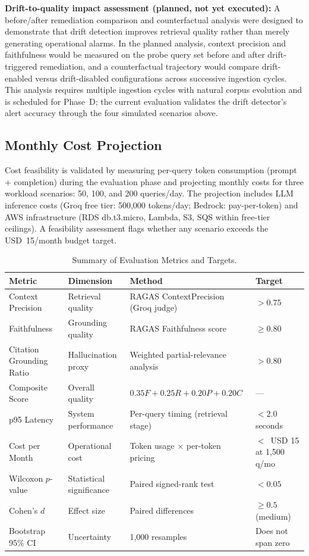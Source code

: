 \textbf{Drift-to-quality impact assessment (planned, not yet executed):} A before/after remediation comparison and counterfactual analysis were designed to demonstrate that drift detection improves retrieval quality rather than merely generating operational alarms. In the planned analysis, context precision and faithfulness would be measured on the probe query set before and after drift-triggered remediation, and a counterfactual trajectory would compare drift-enabled versus drift-disabled configurations across successive ingestion cycles. This analysis requires multiple ingestion cycles with natural corpus evolution and is scheduled for Phase~D; the current evaluation validates the drift detector's alert accuracy through the four simulated scenarios above.

\subsection{Monthly Cost Projection}
\label{sec:cost_projection}

Cost feasibility is validated by measuring per-query token consumption (prompt + completion) during the evaluation phase and projecting monthly costs for three workload scenarios: 50, 100, and 200 queries/day. The projection includes LLM inference costs (Groq free tier: 500{,}000 tokens/day; Bedrock: pay-per-token) and AWS infrastructure (RDS db.t3.micro, Lambda, S3, SQS within free-tier ceilings). A feasibility assessment flags whether any scenario exceeds the USD~15/month budget target.

\begin{table}[H]
\caption{Summary of Evaluation Metrics and Targets.}
\label{tab:eval_targets}
\centering
\begin{tabular}{p{3.0cm}p{3.0cm}p{3.2cm}p{3.0cm}}
\toprule
\textbf{Metric} & \textbf{Dimension} & \textbf{Method} & \textbf{Target} \\
\midrule
Context Precision & Retrieval quality & RAGAS ContextPrecision (Groq judge) & $> 0.75$ \\
Faithfulness & Grounding quality & RAGAS Faithfulness score & $\geq 0.80$ \\
Citation Grounding Ratio & Hallucination proxy & Weighted partial-relevance analysis & $> 0.80$ \\
Composite Score & Overall quality & $0.35F + 0.25R + 0.20P + 0.20C$ & --- \\
p95 Latency & System performance & Per-query timing (retrieval stage) & $< 2.0$ seconds \\
Cost per Month & Operational cost & Token usage $\times$ per-token pricing & $<$~USD 15 at 1,500 q/mo \\
Wilcoxon $p$-value & Statistical significance & Paired signed-rank test & $< 0.05$ \\
Cohen's $d$ & Effect size & Paired differences & $\geq 0.5$ (medium) \\
Bootstrap 95\% CI & Uncertainty & 1{,}000 resamples & Does not span zero \\
\bottomrule
\end{tabular}
\end{table}

